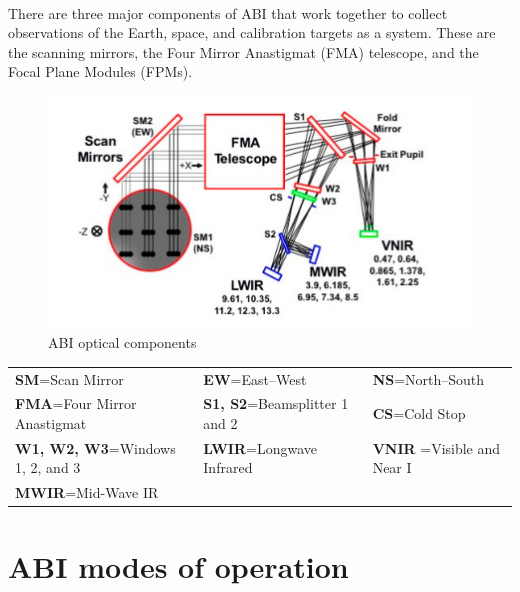 \paragraph{}
There are three major components of ABI that work together to collect observations of the Earth, space, and calibration targets as a system.
These are the scanning mirrors, the Four Mirror Anastigmat (FMA) telescope, and the Focal Plane Modules (FPMs).
\begin{figure}[H]
\begin{center}
\includegraphics[scale=0.8]{abi_pos_image.png} %
\end{center}
\caption{ABI optical components}
\label{ABI optical components}%
\end{figure}
\begin{flushleft}
	\begin{tabular}{lll}
	\textbf{SM}=Scan Mirror&\textbf{EW}=East–West&\textbf{NS}=North–South \\
	\vspace{0.5\baselineskip}
	\textbf{FMA}=Four Mirror Anastigmat&\textbf{S1, S2}=Beamsplitter 1 and 2 &\textbf{CS}=Cold Stop \\
	\vspace{ 0.5\baselineskip}
	\textbf{W1, W2, W3}=Windows 1, 2, and 3&\textbf{LWIR}=Longwave Infrared&\textbf{VNIR }=Visible and Near I\\
	\textbf{MWIR}=Mid-Wave IR&&\\
	\end{tabular}
\end{flushleft}
\section{ABI modes of operation}
\paragraph{}

